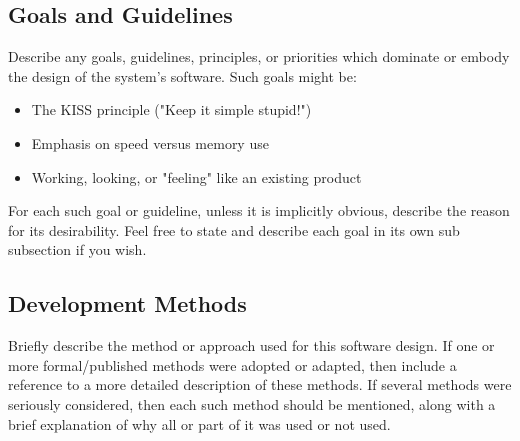 \documentclass{FastFyp}
\begin{document}
\subsection{Goals and Guidelines}
Describe any goals, guidelines, principles, or priorities which dominate or embody the design of the system's software. Such goals might be:
\begin{itemize}
\item The KISS principle ("Keep it simple stupid!") 
\item Emphasis on speed versus memory use 
\item Working, looking, or "feeling" like an existing product
\end{itemize}
For each such goal or guideline, unless it is implicitly obvious, describe the reason for its desirability. Feel free to state and describe each goal in its own sub subsection if you wish.
\subsection{ Development Methods}
Briefly describe the method or approach used for this software design. If one or more formal/published methods were adopted or adapted, then include a reference to a more detailed description of these methods. If several methods were seriously considered, then each such method should be mentioned, along with a brief explanation of why all or part of it was used or not used.
\end{document}
